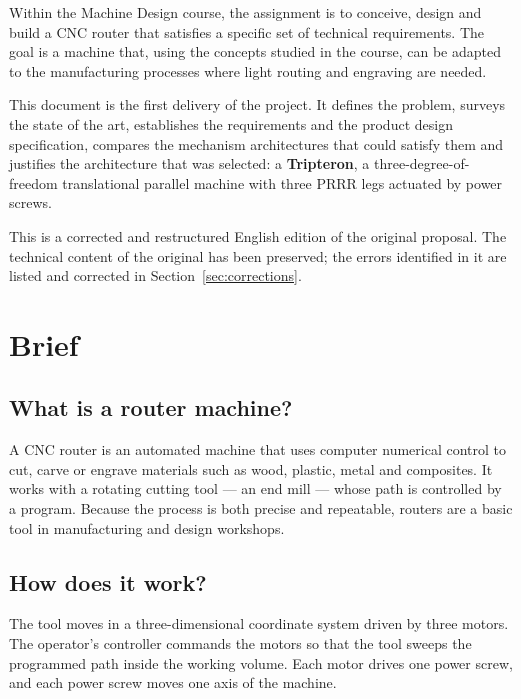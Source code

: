\documentclass[11pt]{article}
\begin{document}
Within the Machine Design course, the assignment is to conceive, design and build a CNC
router that satisfies a specific set of technical requirements. The goal is a machine
that, using the concepts studied in the course, can be adapted to the manufacturing
processes where light routing and engraving are needed.

This document is the first delivery of the project. It defines the problem, surveys the
state of the art, establishes the requirements and the product design specification,
compares the mechanism architectures that could satisfy them and justifies the
architecture that was selected: a \textbf{Tripteron}, a three-degree-of-freedom
translational parallel machine with three PRRR legs actuated by power screws.

This is a corrected and restructured English edition of the original proposal. The
technical content of the original has been preserved; the errors identified in it are
listed and corrected in Section~\ref{sec:corrections}.

\section{Brief}

\subsection{What is a router machine?}

A CNC router is an automated machine that uses computer numerical control to cut, carve or
engrave materials such as wood, plastic, metal and composites. It works with a rotating
cutting tool --- an end mill --- whose path is controlled by a program. Because the
process is both precise and repeatable, routers are a basic tool in manufacturing and
design workshops.

\subsection{How does it work?}

The tool moves in a three-dimensional coordinate system driven by three motors. The
operator's controller commands the motors so that the tool sweeps the programmed path
inside the working volume. Each motor drives one power screw, and each power screw moves
one axis of the machine.
\end{document}
